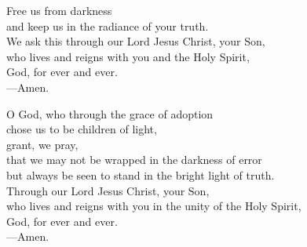 \prayer


\begin{prayerverse}
Free us from darkness\\
and keep us in the radiance of your truth.\\
We ask this through our Lord Jesus Christ, your Son,\\
who lives and reigns with you and the Holy Spirit,\\
God, for ever and ever.\\
{\color{red}---\thinspace}Amen.
\end{prayerverse}


\begin{prayerverse}
O God, who through the grace of adoption\\
chose us to be children of light,\\
grant, we pray,\\
that we may not be wrapped in the darkness of error\\
but always be seen to stand in the bright light of truth.\\
Through our Lord Jesus Christ, your Son,\\
who lives and reigns with you in the unity of the Holy Spirit,\\
God, for ever and ever.\\
{\color{red}---\thinspace}Amen.
\end{prayerverse}

